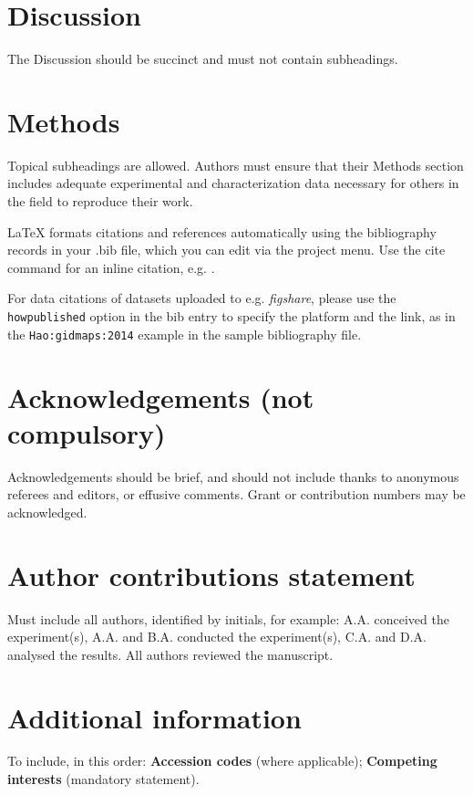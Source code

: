 \documentclass[fleqn,10pt]{wlscirep}
\begin{document}
{\section*{Discussion}

The Discussion should be succinct and must not contain subheadings.

\section*{Methods}

Topical subheadings are allowed. Authors must ensure that their Methods section includes adequate experimental and characterization data necessary for others in the field to reproduce their work.



\noindent LaTeX formats citations and references automatically using the bibliography records in your .bib file, which you can edit via the project menu. Use the cite command for an inline citation, e.g.  \cite{Hao:gidmaps:2014}.

For data citations of datasets uploaded to e.g. \emph{figshare}, please use the \verb|howpublished| option in the bib entry to specify the platform and the link, as in the \verb|Hao:gidmaps:2014| example in the sample bibliography file.

\section*{Acknowledgements (not compulsory)}

Acknowledgements should be brief, and should not include thanks to anonymous referees and editors, or effusive comments. Grant or contribution numbers may be acknowledged.

\section*{Author contributions statement}

Must include all authors, identified by initials, for example:
A.A. conceived the experiment(s),  A.A. and B.A. conducted the experiment(s), C.A. and D.A. analysed the results.  All authors reviewed the manuscript. 

\section*{Additional information}

To include, in this order: \textbf{Accession codes} (where applicable); \textbf{Competing interests} (mandatory statement). 

}
\end{document}
